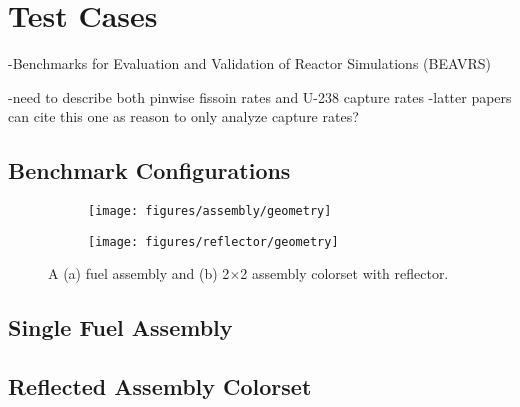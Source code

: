 \section{Test Cases}
\label{sec:Test Cases}

-Benchmarks for Evaluation and Validation of Reactor Simulations (BEAVRS)~\cite{horelik2013beavrs}

-need to describe both pinwise fissoin rates and U-238 capture rates
  -latter papers can cite this one as reason to only analyze capture rates?


\subsection{Benchmark Configurations}
\label{subsec:benchmarks}

\begin{figure}[h!]
\centering
\begin{subfigure}{0.45\textwidth}
  \texttt{[image: figures/assembly/geometry]}
  \caption{}
  \label{fig:benchmarks-assm}
\end{subfigure}
\begin{subfigure}{0.45\textwidth}
  \centering
  \texttt{[image: figures/reflector/geometry]}
  \caption{}
  \label{fig:benchmarks-reflector}
\end{subfigure}
\caption{A (a) fuel assembly and (b) 2$\times$2 assembly colorset with reflector.}
\label{fig:benchmarks}
\end{figure}


\subsection{Single Fuel Assembly}
\label{subsubsec:benchmarks-assm}

\subsection{Reflected Assembly Colorset}
\label{subsubsec:benchmarks-2x2}




